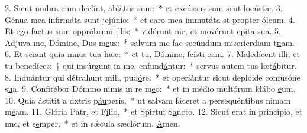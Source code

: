2. Sicut umbra cum declínt, abl\uline{á}tus sum:~* et excússus sum scut loc\uline{ú}stæ.
3. Génua mea infirmáta sunt  jej\uline{ú}nio:~* et caro mea immutáta st propter \uline{ó}leum.
4. Et ego factus sum oppróbrum \uline{i}llis:~* vidérunt me, et movérunt cpita s\uline{u}a.
5. Adjuva me, Dómine, Dus m\uline{e}us:~* salvum me fac secúndum misericrdiam t\uline{u}am.
6. Et sciant quia mnus t\uline{u}a hæc:~* et tu, Dómine, fcísti \uline{e}am.
7. Maledícent illi, et tu benedíces:~† qui insúrgunt in me, cnfund\uline{á}ntur:~* servus autem tus læt\uline{á}bitur.
8. Induántur qui détrahunt mih, pud\uline{ó}re:~* et operiántur sicut deplóide confusóne s\uline{u}a.
9. Confitébor Dómino nimis in re m\uline{e}o:~* et in médio multórum ldábo \uline{e}um.
10. Quia ástitit a dxtris p\uline{áu}peris,~* ut salvam fáceret a persequéntibus nimam m\uline{e}am.
11. Glória Patr, et F\uline{í}lio,~* et Spirtui S\uline{a}ncto.
12. Sicut erat in princípio, et nnc, et s\uline{e}mper,~* et in sǽcula sæclórum. \uline{A}men.
